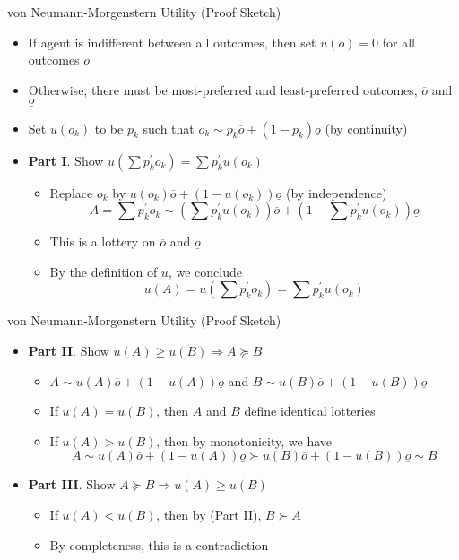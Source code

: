 \documentclass[11pt,aspectratio=169]{beamer}
\begin{document}
  \begin{frame}{von Neumann-Morgenstern Utility (Proof Sketch)}
   \begin{itemize}[<+->]
    \item If agent is indifferent between all outcomes, then set $u(o) = 0$ for all outcomes $o$
    \item Otherwise, there must be most-preferred and least-preferred outcomes, $\overline{o}$ and $\underline{o}$
    \item Set $u(o_k)$ to be $p_k$ such that $o_k \sim p_k\overline{o}+(1-p_k)\underline{o}$ (by \alert{continuity})
    \item \textbf{Part I}.
    Show $u\left(\sum p^\prime_k o_k\right) = \sum p^\prime_k u(o_k)$
    \begin{itemize}[<.(1)->]
     \item Replace $o_k$ by $u(o_k)\overline{o}+(1-u(o_k))\underline{o}$ (by \alert{independence})
      \[A = \sum p^\prime_k o_k \sim \left(\sum p^\prime_k u(o_k)\right) \overline{o} + \left(1-\sum p^\prime_k u(o_k)\right)\underline{o}\]
     \item This is a lottery on $\overline{o}$ and $\underline{o}$
     \item By the definition of $u$, we conclude
       \[u(A) = u\left(\sum p^\prime_k o_k\right) = \sum p^\prime_k u(o_k)\]
    \end{itemize}
   \end{itemize}
  \end{frame}
  
  \begin{frame}{von Neumann-Morgenstern Utility (Proof Sketch)}
   \begin{itemize}[<+->]
    \item \textbf{Part II}.
    Show $u(A) \ge u(B) \Longrightarrow A \succeq B$
    \begin{itemize}[<.(1)->]
     \item $A \sim u(A)\overline{o} + (1-u(A))\underline{o}$ and $B \sim u(B)\overline{o} + (1-u(B))\underline{o}$
     \item If $u(A) = u(B)$, then $A$ and $B$ define identical lotteries
     \item If $u(A) > u(B)$, then by \alert{monotonicity}, we have
     \[A \sim u(A)\overline{o} + (1-u(A))\underline{o} \succ u(B)\overline{o} + (1-u(B))\underline{o} \sim B\]
    \end{itemize}
    \item \textbf{Part III}.
    Show $A \succeq B \Longrightarrow u(A) \ge u(B)$
    \begin{itemize}[<.(1)->]
     \item If $u(A) < u(B)$, then by (Part II), $B \succ A$
     \item By \alert{completeness}, this is a contradiction
    \end{itemize}
   \end{itemize}
  \end{frame}
  
\end{document}
